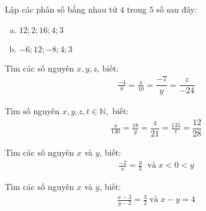 \begin{bt}
\end{bt}   \begin{bt}

Lập các phân số bằng nhau từ $4$ trong $5$ số sau đây:
\begin{enumerate}[a)]
\item $12; 2; 16; 4;3$
\item $-6; 12; -8; 4; 3$
\end{enumerate}

\end{bt}   \begin{bt}

Tìm các số nguyên $x, y, z$, biết:
 \begin{align*}
 \frac{-4}{8}=\frac{x}{10}=\dfrac{-7}{y}=\dfrac{z}{-24}
 \end{align*}
 
\end{bt}   \begin{bt}

Tìm số nguyên $x, y, z, t \in \mathbb{N},$ biết:
\begin{align*}
\frac{x}{140} = \frac{18}{y} = \dfrac{z}{21} = \frac{135}{t} = \dfrac{12}{28}
\end{align*}

\end{bt}   \begin{bt}

Tìm các số nguyên $x$ và $y$, biết:
\begin{align*}
\frac{-2}{x} = \frac{y}{3}\;\text{ và} \; x<0<y
\end{align*}

\end{bt}   \begin{bt}

Tìm các số nguyên $x$ và $y$, biết:
\begin{align*}
\frac{x-3}{y-2} =\frac{3}{2} \; \text{và} \; x-y=4
\end{align*}
\end{bt}